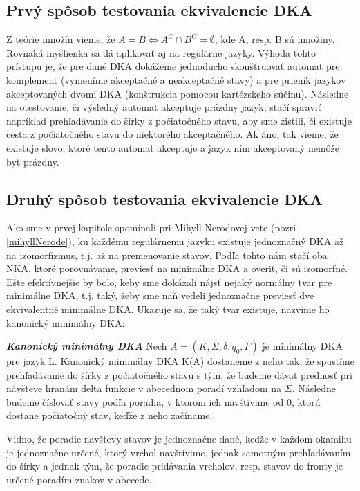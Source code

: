 \subsection{Prvý spôsob testovania ekvivalencie DKA}
Z teórie množín vieme, že $A = B \Longleftrightarrow A^C \cap B^C = \emptyset$, kde A, resp. B sú množiny. Rovnaká myšlienka sa dá aplikovať aj na regulárne jazyky. Výhoda tohto prístupu je, že pre dané DKA dokážeme jednoducho skonštruovať automat pre komplement (vymeníme akceptačné a neakceptačné stavy) a pre prienik jazykov akceptovaných dvomi DKA (konštrukcia pomocou kartézskeho súčinu). Následne na otestovanie, či výsledný automat akceptuje prázdny jazyk, stačí spraviť napríklad prehľadávanie do šírky z počiatočného stavu, aby sme zistili, či existuje cesta z počiatočného stavu do niektorého akceptačného. Ak áno, tak vieme, že existuje slovo, ktoré tento automat akceptuje a jazyk ním akceptovaný nemôže byť prázdny.

\subsection{Druhý spôsob testovania ekvivalencie DKA}
Ako sme v prvej kapitole spomínali pri Mihyll-Nerodovej vete (pozri \ref{mihyllNerode}), ku každému regulárnemu jazyku existuje jednoznačný DKA až na izomorfizmus, t.j. až na premenovanie stavov. Podľa tohto nám stačí oba NKA, ktoré porovnávame, previesť na minimálne DKA a overiť, či sú izomorfné. Ešte efektívnejšie by bolo, keby sme dokázali nájsť nejaký normálny tvar pre minimálne DKA, t.j. taký, žeby sme naň vedeli jednoznačne previesť dve ekvivalentné minimálne DKA. Ukazuje sa, že taký tvar existuje, nazvime ho kanonický minimálny DKA:
\\

\label{kanMinDKA}
\begin{defn}{\textbf {\textit {Kanonický minimálny DKA}}} Nech $A = (K,\Sigma,\delta,q_0,F)$ je minimálny DKA pre jazyk L. Kanonický minimálny DKA K(A) dostaneme z neho tak, že spustíme prehľadávanie do šírky z počiatočného stavu s tým, že budeme dávať prednosť pri návšteve hranám delta funkcie v abecednom poradí vzhľadom na $\Sigma$. Následne budeme číslovať stavy podľa poradia, v ktorom ich navštívime od 0, ktorú dostane počiatočný stav, keďže z neho začíname.
\end{defn}
Vidno, že poradie navštevy stavov je jednoznačne dané, kedže v každom okamihu je jednoznačne určené, ktorý vrchol navštívime, jednak samotným prehľadávaním do šírky a jednak tým, že poradie pridávania vrcholov, resp. stavov do fronty je určené poradím znakov v abecede.

